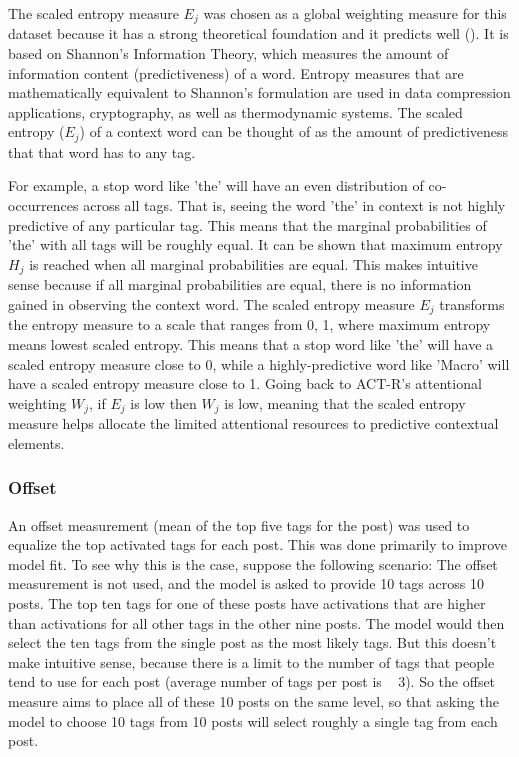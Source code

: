 \documentclass[10pt,letterpaper]{article}
\begin{document}
The scaled entropy measure $E_{j}$ was chosen as a global weighting measure for this dataset because it has a strong theoretical foundation and it predicts well ().
It is based on Shannon's Information Theory, which measures the amount of information content (predictiveness) of a word.
Entropy measures that are mathematically equivalent to Shannon's formulation are used in data compression applications, cryptography, as well as thermodynamic systems.
The scaled entropy ($E_{j}$) of a context word can be thought of as the amount of predictiveness that that word has to any tag.

For example, a stop word like 'the' will have an even distribution of co-occurrences across all tags.
That is, seeing the word 'the' in context is not highly predictive of any particular tag.
This means that the marginal probabilities of 'the' with all tags will be roughly equal.
It can be shown that maximum entropy $H_{j}$ is reached when all marginal probabilities are equal.
This makes intuitive sense because if all marginal probabilities are equal, there is no information gained in observing the context word.
The scaled entropy measure $E_{j}$ transforms the entropy measure to a scale that ranges from 0, 1, where maximum entropy means lowest scaled entropy.
This means that a stop word like 'the' will have a scaled entropy measure close to 0, while a highly-predictive word like 'Macro' will have a scaled entropy measure close to 1.
Going back to ACT-R's attentional weighting $W_{j}$, if $E_{j}$ is low then $W_{j}$ is low, meaning that the scaled entropy measure helps allocate the limited attentional resources to predictive contextual elements.

\subsubsection{Offset}

An offset measurement (mean of the top five tags for the post) was used to equalize the top activated tags for each post.
This was done primarily to improve model fit.
To see why this is the case, suppose the following scenario:
The offset measurement is not used, and the model is asked to provide 10 tags across 10 posts.
The top ten tags for one of these posts have activations that are higher than activations for all other tags in the other nine posts.
The model would then select the ten tags from the single post as the most likely tags.
But this doesn't make intuitive sense, because there is a limit to the number of tags that people tend to use for each post (average number of tags per post is ~ 3).
So the offset measure aims to place all of these 10 posts on the same level, so that asking the model to choose 10 tags from 10 posts will select roughly a single tag from each post.
\end{document}
